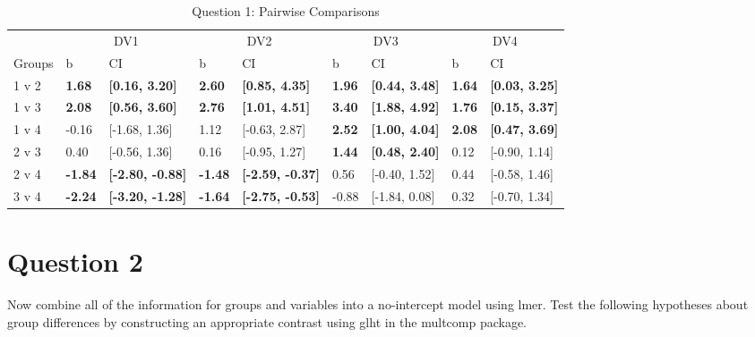 \documentclass{article}\usepackage[]{graphicx}\usepackage[]{color}
\newenvironment{knitrout}{}{} %
\begin{document}
\begin{knitrout}
\begin{table}
\caption{\label{tab:unnamed-chunk-5}Question 1: Pairwise Comparisons}
\centering
\begin{tabular}[t]{lllllllll}
\toprule
\multicolumn{1}{c}{ } & \multicolumn{2}{c}{DV1} & \multicolumn{2}{c}{DV2} & \multicolumn{2}{c}{DV3} & \multicolumn{2}{c}{DV4} \\
\cmidrule(l{2pt}r{2pt}){2-3} \cmidrule(l{2pt}r{2pt}){4-5} \cmidrule(l{2pt}r{2pt}){6-7} \cmidrule(l{2pt}r{2pt}){8-9}
Groups & b & CI & b & CI & b & CI & b & CI\\
\midrule
1 v 2 & \textbf{1.68} & \textbf{[0.16, 3.20]} & \textbf{2.60} & \textbf{[0.85, 4.35]} & \textbf{1.96} & \textbf{[0.44, 3.48]} & \textbf{1.64} & \textbf{[0.03, 3.25]}\\
1 v 3 & \textbf{2.08} & \textbf{[0.56, 3.60]} & \textbf{2.76} & \textbf{[1.01, 4.51]} & \textbf{3.40} & \textbf{[1.88, 4.92]} & \textbf{1.76} & \textbf{[0.15, 3.37]}\\
1 v 4 & -0.16 & [-1.68, 1.36] & 1.12 & [-0.63, 2.87] & \textbf{2.52} & \textbf{[1.00, 4.04]} & \textbf{2.08} & \textbf{[0.47, 3.69]}\\
2 v 3 & 0.40 & [-0.56, 1.36] & 0.16 & [-0.95, 1.27] & \textbf{1.44} & \textbf{[0.48, 2.40]} & 0.12 & [-0.90, 1.14]\\
2 v 4 & \textbf{-1.84} & \textbf{[-2.80, -0.88]} & \textbf{-1.48} & \textbf{[-2.59, -0.37]} & 0.56 & [-0.40, 1.52] & 0.44 & [-0.58, 1.46]\\
3 v 4 & \textbf{-2.24} & \textbf{[-3.20, -1.28]} & \textbf{-1.64} & \textbf{[-2.75, -0.53]} & -0.88 & [-1.84, 0.08] & 0.32 & [-0.70, 1.34]\\
\bottomrule
\end{tabular}
\end{table}


\end{knitrout}



\section{Question 2}
Now combine all of the information for groups and variables into a no-intercept model using lmer\( \). Test the following hypotheses about group differences by constructing an appropriate contrast using glht\( \) in the multcomp package. \\
\end{document}
